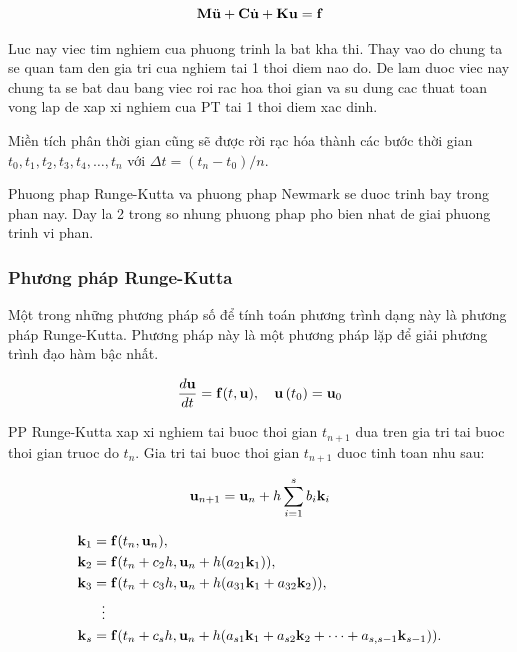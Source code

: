 \begin{equation}\label{eq_PT_general}
    {\bf M}\ddot{\bf u} + {\bf C}\dot{\bf u} + {\bf K}{\bf u} = {\bf f}
\end{equation}

Luc nay viec tim nghiem cua phuong trinh la bat kha thi. Thay vao do chung ta se quan tam den gia tri cua nghiem tai 1 thoi diem nao do. De lam duoc viec nay chung ta se bat dau bang viec roi rac hoa thoi gian va su dung cac thuat toan vong lap de xap xi nghiem cua PT tai 1 thoi diem xac dinh.

Miền tích phân thời gian cũng sẽ được rời rạc hóa thành các bước thời gian $t_0, t_1, t_2, t_3, t_4, \dots, t_n$ với $\Delta t = (t_n-t_0)/n$.

Phuong phap Runge-Kutta va phuong phap Newmark se duoc trinh bay trong phan nay. Day la 2 trong so nhung phuong phap pho bien nhat de giai phuong trinh vi phan.

\subsubsection{Phương pháp Runge-Kutta}

Một trong những phương pháp số để tính toán phương trình dạng này là phương pháp Runge-Kutta. Phương pháp này là một phương pháp lặp để giải phương trình đạo hàm bậc nhất.

\begin{equation}
    \frac{d {\bf u}}{d t}={\bf f}(t,{\bf u}) ,\quad {\bf u}\left(t_0\right)={\bf u}_0
\end{equation}

PP Runge-Kutta xap xi nghiem tai buoc thoi gian $t_{n+1}$ dua tren gia tri tai buoc thoi gian truoc do $t_n$. Gia tri tai buoc thoi gian $t_{n+1}$ duoc tinh toan nhu sau:

\begin{equation}
    {\bf u}_{n+1} = {\bf u}_n + h \sum_{i=1}^s b_i {\bf k}_i
\end{equation}

\begin{equation}
\begin{aligned}
     {\bf k}_1 & = {\bf f}(t_n, {\bf u}_n), \\
     {\bf k}_2 & = {\bf f}(t_n+c_2h, {\bf u}_n+h(a_{21}{\bf k}_1)), \\
     {\bf k}_3 & = {\bf f}(t_n+c_3h, {\bf u}_n+h(a_{31}{\bf k}_1+a_{32}{\bf k}_2)), \\
         & \ \ \vdots \\
     {\bf k}_s & = {\bf f}(t_n+c_sh, {\bf u}_n+h(a_{s1}{\bf k}_1+a_{s2}{\bf k}_2+\cdots+a_{s,s-1}{\bf k}_{s-1})).
\end{aligned}
\end{equation}

